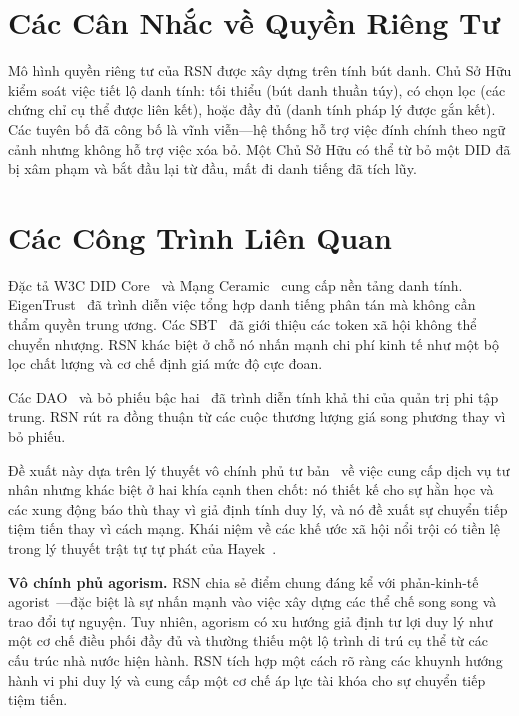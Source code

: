\documentclass[11pt,a4paper,twocolumn]{article}
\begin{document}
\section{Các Cân Nhắc về Quyền Riêng Tư}

Mô hình quyền riêng tư của RSN được xây dựng trên tính bút danh. Chủ Sở Hữu kiểm soát việc tiết lộ danh tính: tối thiểu (bút danh thuần túy), có chọn lọc (các chứng chỉ cụ thể được liên kết), hoặc đầy đủ (danh tính pháp lý được gắn kết). Các tuyên bố đã công bố là vĩnh viễn---hệ thống hỗ trợ việc đính chính theo ngữ cảnh nhưng không hỗ trợ việc xóa bỏ. Một Chủ Sở Hữu có thể từ bỏ một DID đã bị xâm phạm và bắt đầu lại từ đầu, mất đi danh tiếng đã tích lũy.

\section{Các Công Trình Liên Quan}

Đặc tả W3C DID Core~\cite{did2022} và Mạng Ceramic~\cite{ceramic2023} cung cấp nền tảng danh tính. EigenTrust~\cite{kamvar2003} đã trình diễn việc tổng hợp danh tiếng phân tán mà không cần thẩm quyền trung ương. Các SBT~\cite{weyl2022} đã giới thiệu các token xã hội không thể chuyển nhượng. RSN khác biệt ở chỗ nó nhấn mạnh chi phí kinh tế như một bộ lọc chất lượng và cơ chế định giá mức độ cực đoan.

Các DAO~\cite{buterin2014} và bỏ phiếu bậc hai~\cite{buterin2019} đã trình diễn tính khả thi của quản trị phi tập trung. RSN rút ra đồng thuận từ các cuộc thương lượng giá song phương thay vì bỏ phiếu.

Đề xuất này dựa trên lý thuyết vô chính phủ tư bản~\cite{rothbard1973,hoppe2001} về việc cung cấp dịch vụ tư nhân nhưng khác biệt ở hai khía cạnh then chốt: nó thiết kế cho sự hằn học và các xung động báo thù thay vì giả định tính duy lý, và nó đề xuất sự chuyển tiếp tiệm tiến thay vì cách mạng. Khái niệm về các khế ước xã hội nổi trội có tiền lệ trong lý thuyết trật tự tự phát của Hayek~\cite{hayek1973}.

\textbf{Vô chính phủ agorism.} RSN chia sẻ điểm chung đáng kể với phản-kinh-tế agorist~\cite{konkin2006}---đặc biệt là sự nhấn mạnh vào việc xây dựng các thể chế song song và trao đổi tự nguyện. Tuy nhiên, agorism có xu hướng giả định tư lợi duy lý như một cơ chế điều phối đầy đủ và thường thiếu một lộ trình di trú cụ thể từ các cấu trúc nhà nước hiện hành. RSN tích hợp một cách rõ ràng các khuynh hướng hành vi phi duy lý và cung cấp một cơ chế áp lực tài khóa cho sự chuyển tiếp tiệm tiến.
\end{document}
